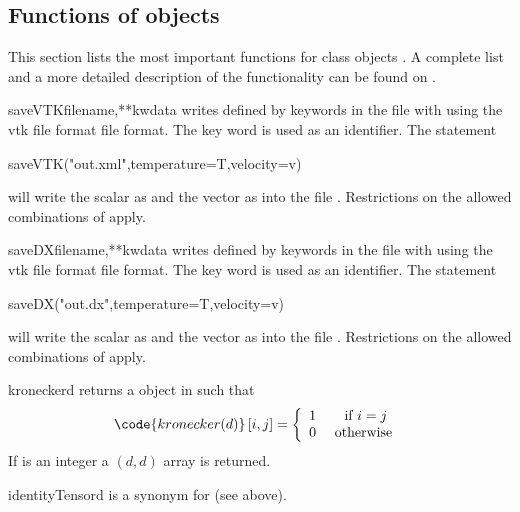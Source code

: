 \subsection{Functions of \Data objects}
This section lists the most important functions for \Data class objects .
A complete list and a more detailed description of the functionality can be found on \ReferenceGuide.
\begin{funcdesc}{saveVTK}{filename,**kwdata}
writes \Data defined by keywords in the file with  using the 
vtk file format \VTK file format. The key word is used as an identifier. The statement
\begin{python}
  saveVTK("out.xml",temperature=T,velocity=v)
\end{python} 
will write the scalar  as  and the vector  as   into the 
file . Restrictions on the allowed combinations of \FunctionSpace apply.
\end{funcdesc}
\begin{funcdesc}{saveDX}{filename,**kwdata}
writes \Data defined by keywords in the file with  using the 
vtk file format \OpenDX file format. The key word is used as an identifier. The statement
\begin{python}
  saveDX("out.dx",temperature=T,velocity=v)
\end{python} 
will write the scalar  as  and the vector  as   into the 
file . Restrictions on the allowed combinations of \FunctionSpace apply.
\end{funcdesc}
\begin{funcdesc}{kronecker}{d}
returns a \RankTwo \Data object in \FunctionSpace {} such that
\begin{equation}
\code{kronecker(d)}\left[ i,j\right] = \left\{ 
\begin{array}{cc}
1 & \mbox{ if } i=j \\
0 & \mbox{ otherwise }
\end{array}
\right.
\end{equation}
If  is an integer a $(d,d)$ \numpy array is returned.
\end{funcdesc}
\begin{funcdesc}{identityTensor}{d}
is a synonym for  (see above).
\end{funcdesc}
